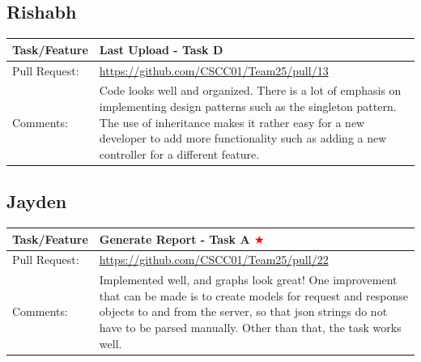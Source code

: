 \documentclass[12pt]{article}
\begin{document}
\subsection{Rishabh}

\begin{table}[H]
\begin{tabular}{|p{3cm}|p{11cm}|}
\hline
Task/Feature  & Last Upload - Task D
 \\ \hline
Pull Request: & \url{https://github.com/CSCC01/Team25/pull/13}                                                                                                                                                                                                                                                                                                                      \\ \hline

Comments:     & Code looks well and organized. There is a lot of emphasis on implementing design patterns such as the singleton pattern. The use of inheritance makes it rather easy for a new developer to add more functionality such as adding a new controller for a different feature.
 \\ \hline
\end{tabular}
\end{table}

\subsection{Jayden}

\begin{table}[H]
\begin{tabular}{|p{3cm}|p{11cm}|}
\hline
Task/Feature  & Generate Report - Task A \textcolor{red}{$\bigstar$}
 \\ \hline
Pull Request: & \url{https://github.com/CSCC01/Team25/pull/22}                                                                                                                                                                                                                                                                                                                      \\ \hline
Comments:     & Implemented well, and graphs look great! One improvement that can be made is to create models for request and response objects to and from the server, so that json strings do not have to be parsed manually. Other than that, the task works well.
 \\ \hline
\end{tabular}
\end{table}
\end{document}
